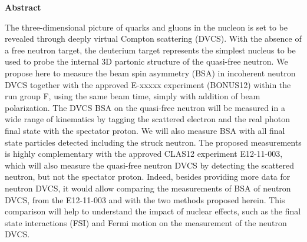 \setcounter{page}{5}

     \begin{center}
{\large\textbf{Abstract}}
    \end{center}
\vspace*{0.4cm}

The three-dimensional picture of quarks and gluons in the nucleon is set to be 
revealed through deeply virtual Compton scattering (DVCS). With the absence of 
a free neutron target, the deuterium target represents the simplest nucleus to 
be used to probe the internal 3D partonic structure of the quasi-free neutron.  
We propose here to measure the beam spin asymmetry (BSA) in incoherent neutron DVCS 
together with the approved E-xxxxx experiment (BONUS12) within the run group F, 
using the same beam time, simply with addition of beam polarization. The DVCS BSA on the
quasi-free neutron will be measured in a wide range of kinematics by tagging 
the scattered electron and the real photon final state with the spectator 
proton. We will also measure BSA with all final state particles detected
including the struck 
neutron. The proposed measurements is highly complementary with the approved CLAS12 
experiment E12-11-003, which will also measure the quasi-free neutron DVCS by 
detecting the scattered neutron, but not the spectator proton. 
Indeed, besides providing more data for neutron DVCS, it would allow comparing 
the measurements of BSA of neutron DVCS, from the E12-11-003 and with
the two methods proposed herein. This comparison will help to understand the impact of 
nuclear effects, such as the final state interactions (FSI) and Fermi motion 
on the measurement of the neutron DVCS.

\newpage

